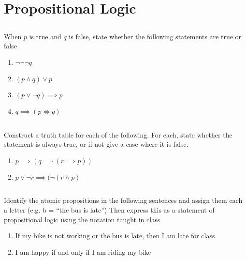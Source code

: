 \documentclass[twocolumn]{article}
\begin{document}
\clearpage
\section{Propositional Logic}

\subsection{}

When $p$ is true and $q$ is false, state whether the following statements are true or false

\begin{enumerate}
    \item $\neg \neg \neg q$
    \item $(p \wedge q) \vee p$
    \item $(p \vee \neg q) \implies p$
    \item $q \implies (p \Leftrightarrow q)$
\end{enumerate}

\subsection{}

Construct a truth table for each of the following. For each, state whether the statement is always true, or if not give a case where it is false.

\begin{enumerate}
    \item $ p \implies (q \implies ( r \implies p )) $
    \item $ p \vee \neg r \implies (\neg ( r \wedge p ) $
\end{enumerate}

\subsection{}

Identify the atomic propositions in the following sentences and assign them each a letter (e.g. b = ``the bus is late'') Then express this as a statement of propositional logic using the notation taught in class

\begin{enumerate}
    \item If my bike is not working or the bus is late, then I am late for class
    \item I am happy if and only if I am riding my bike
\end{enumerate}
\end{document}
